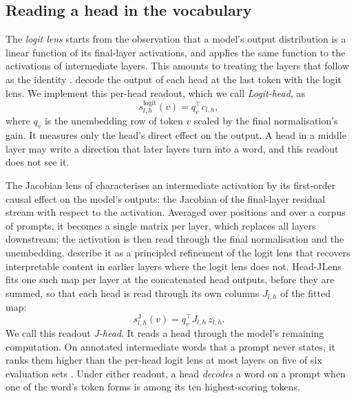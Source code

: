 \documentclass[10pt,a4paper]{article}
\begin{document}
\subsection{Reading a head in the vocabulary}\label{sec:bg-lens}

The \emph{logit lens} \citep{nostalgebraist2020logitlens} starts from the observation that a model's output distribution is a linear function of its final-layer activations, and applies the same function to the activations of intermediate layers. This amounts to treating the layers that follow as the identity \citep{gurnee2026workspace}. \citet{yang2026shared} decode the output of each head at the last token with the logit lens. We implement this per-head readout, which we call \emph{Logit-head}, as
\begin{equation}
s^{\text{logit}}_{l,h}(v) = q_v^\top c_{l,h},
\end{equation}
where $q_v$ is the unembedding row of token $v$ scaled by the final normalisation's gain. It measures only the head's direct effect on the output. A head in a middle layer may write a direction that later layers turn into a word, and this readout does not see it.

The Jacobian lens of \citet{gurnee2026workspace} characterises an intermediate activation by its first-order causal effect on the model's outputs: the Jacobian of the final-layer residual stream with respect to the activation. Averaged over positions and over a corpus of prompts, it becomes a single matrix per layer, which replaces all layers downstream; the activation is then read through the final normalisation and the unembedding. \citeauthor{gurnee2026workspace} describe it as a principled refinement of the logit lens that recovers interpretable content in earlier layers where the logit lens does not. Head-JLens \citep{merlo2026headjlens} fits one such map per layer at the concatenated head outputs, before they are summed, so that each head is read through its own columns $J_{l,h}$ of the fitted map:
\begin{equation}
s^{\text{J}}_{l,h}(v) = q_v^\top J_{l,h}\, z_{l,h}.
\end{equation}
We call this readout \emph{J-head}. It reads a head through the model's remaining computation. On annotated intermediate words that a prompt never states, it ranks them higher than the per-head logit lens at most layers on five of six evaluation sets \citep[Sec.~3]{merlo2026headjlens}. Under either readout, a head \emph{decodes} a word on a prompt when one of the word's token forms is among its ten highest-scoring tokens.
\end{document}
